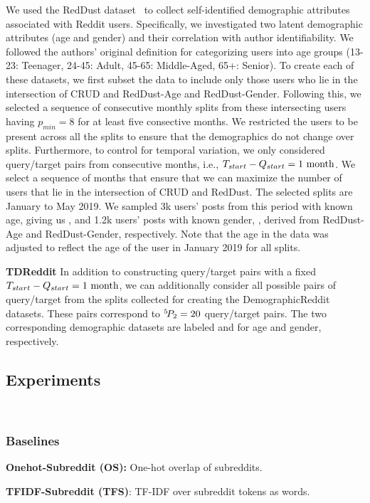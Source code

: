 We used the RedDust dataset~\cite{tigunova2020reddust} to collect self-identified demographic attributes associated with Reddit users. 
Specifically, we investigated two latent demographic attributes (age and gender) and their correlation with author identifiability.
We followed the authors' original definition for categorizing users into age groups (13-23: Teenager, 24-45: Adult, 45-65: Middle-Aged, 65+: Senior).
To create each of these datasets, we first subset the data to include only those users who lie in the intersection of CRUD and RedDust-Age and RedDust-Gender. 
Following this, we selected a sequence of consecutive monthly splits from these intersecting users having $p_{min} = 8$ for at least five consective months. 
We restricted the users to be present across all the splits to ensure that the demographics do not change over splits.
Furthermore, to control for temporal variation, we only considered query/target pairs from consecutive months, i.e., $T_{start} - Q_{start} = 1~\rm{month}$.
We select a sequence of months that ensure that we can maximize the number of users that lie in the intersection of CRUD and RedDust.
The selected splits are January to May 2019.
We sampled 3k users' posts from this period with known age, giving us \DSagefixed{}, and 1.2k users' posts with known gender, \DSgenderfixed{}, derived from RedDust-Age and RedDust-Gender, respectively.
Note that the age in the data was adjusted to reflect the age of the user in January 2019 for all splits.

\textbf{TDReddit}
In addition to constructing query/target pairs with a fixed $T_{start} - Q_{start} = 1~\rm{month}$, we can additionally consider all possible pairs of query/target from the splits collected for creating the DemographicReddit datasets.
These pairs correspond to ${}^{5}\!P_{2} = 20$ query/target pairs.
The two corresponding demographic datasets are labeled \DSagevary{} and \DSgendervary{} for age and gender, respectively.

\subsection{Experiments}\

\subsubsection{Baselines}

\noindent \textbf{Onehot-Subreddit (OS):}
One-hot overlap of subreddits.

\noindent \textbf{TFIDF-Subreddit (TFS)}:
TF-IDF over subreddit tokens as words.

